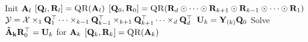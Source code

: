 \begin{algorithmic}[1]
      \State Init $\mathbf{A}_l$
      \State $[\mat{Q}_l,\mat{R}_l] = \Call{QR}{\mat{A}_l}$ 
      \EndFor
      \State $[\mat{Q}_0,\mat{R}_0] = \Call{QR}{\mat{R}_d \odot \cdots \odot \mat{R}_{k+1} \odot \mat{R}_{k-1} \odot \cdots \odot \mat{R}_1}$
      \State ${\mathbf{\cal{Y}}} =  {\mathbf{\cal{X}}} \times_1 \mathbf{Q}_1^\top \dots \times_{k-1} \mathbf{Q}_{k-1}^\top \times_{k+1} \mathbf{Q}_{k+1}^\top \dots \times_d \mathbf{Q}_d^\top$  \label{l:EXP-TTM}
      \State $\mathbf{U}_k = \mathbf{Y}_{(k)}\mathbf{Q}_0$ \label{l:apply}
      \State Solve $\mathbf{\hat{A}_k}\mathbf{R}_0^\top = \mathbf{U}_k$ for $\mathbf{A}_k$ 
      \State $[\mat{Q}_k,\mat{R}_k] = \Call{QR}{\mat{A}_k}$      
      \EndFor
      \EndWhile
    \EndFunction
  \end{algorithmic}